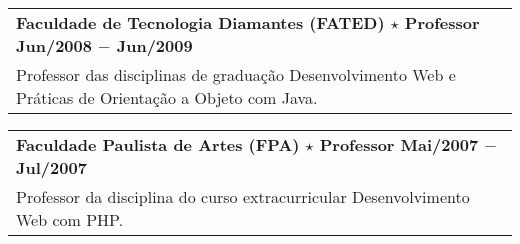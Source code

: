 \documentclass[a4paper, oneside, final]{scrartcl}
\newcommand{\vspc}{\vspace{0.15cm}} %
\begin{document}
\begin{center}
\begin{tabularx}{1\linewidth}{X}
{\bf Faculdade de Tecnologia Diamantes (FATED) $\star$ Professor \hfill Jun/2008 $-$ Jun/2009} \\
Professor das disciplinas de graduação Desenvolvimento Web e Práticas de Orientação a Objeto com Java. \vspc\\
\end{tabularx}

\begin{tabularx}{1\linewidth}{X}
{\bf Faculdade Paulista de Artes (FPA) $\star$ Professor  \hfill Mai/2007 $-$ Jul/2007} \\
Professor da disciplina do curso extracurricular Desenvolvimento Web com PHP. \vspc\\
\end{tabularx}



\end{center}
\end{document}
